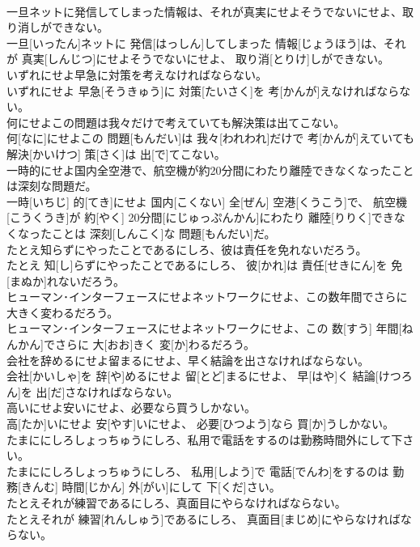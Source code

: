 \documentclass[8pt]{extreport}
\begin{document}
\begin{CJK}{UTF8}{min}
\\	一旦ネットに発信してしまった情報は、それが真実にせよそうでないにせよ、取り消しができない。	
\\	一旦[いったん]ネットに 発信[はっしん]してしまった 情報[じょうほう]は、それが 真実[しんじつ]にせよそうでないにせよ、 取り消[とりけ]しができない。
\\	いずれにせよ早急に対策を考えなければならない。	
\\	いずれにせよ 早急[そうきゅう]に 対策[たいさく]を 考[かんが]えなければならない。
\\	何にせよこの問題は我々だけで考えていても解決策は出てこない。	
\\	何[なに]にせよこの 問題[もんだい]は 我々[われわれ]だけで 考[かんが]えていても 解決[かいけつ] 策[さく]は 出[で]てこない。
\\	一時的にせよ国内全空港で、航空機が約20分間にわたり離陸できなくなったことは深刻な問題だ。	
\\	一時[いちじ] 的[てき]にせよ 国内[こくない] 全[ぜん] 空港[くうこう]で、 航空機[こうくうき]が 約[やく] 20分間[にじゅっぷんかん]にわたり 離陸[りりく]できなくなったことは 深刻[しんこく]な 問題[もんだい]だ。
\\	たとえ知らずにやったことであるにしろ、彼は責任を免れないだろう。	
\\	たとえ 知[し]らずにやったことであるにしろ、 彼[かれ]は 責任[せきにん]を 免[まぬか]れないだろう。
\\	ヒューマン･インターフェースにせよネットワークにせよ、この数年間でさらに大きく変わるだろう。	
\\	ヒューマン･インターフェースにせよネットワークにせよ、この 数[すう] 年間[ねんかん]でさらに 大[おお]きく 変[か]わるだろう。
\\	会社を辞めるにせよ留まるにせよ、早く結論を出さなければならない。	
\\	会社[かいしゃ]を 辞[や]めるにせよ 留[とど]まるにせよ、 早[はや]く 結論[けつろん]を 出[だ]さなければならない。
\\	高いにせよ安いにせよ、必要なら買うしかない。	
\\	高[たか]いにせよ 安[やす]いにせよ、 必要[ひつよう]なら 買[か]うしかない。
\\	たまににしろしょっちゅうにしろ、私用で電話をするのは勤務時間外にして下さい。	
\\	たまににしろしょっちゅうにしろ、 私用[しよう]で 電話[でんわ]をするのは 勤務[きんむ] 時間[じかん] 外[がい]にして 下[くだ]さい。
\\	たとえそれが練習であるにしろ、真面目にやらなければならない。	
\\	たとえそれが 練習[れんしゅう]であるにしろ、 真面目[まじめ]にやらなければならない。

\end{CJK}
\end{document}
